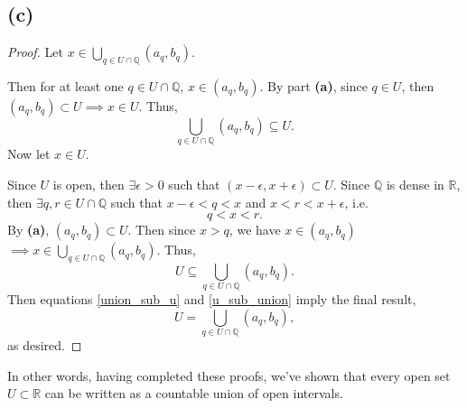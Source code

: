 \documentclass{article}
\begin{document}
\subsection*{(c)}
\begin{proof}
	Let $x \in \bigcup_{q \in U\cap\mathbb{Q}}(a_q, b_q)$. 
	
	Then for at least one $q\in U\cap \mathbb{Q}$, $x\in(a_q, b_q)$. By part \textbf{(a)}, since $q\in U$, then $(a_q, b_q) \subset U \implies x \in U$. Thus,
	\begin{equation}\label{union_sub_u}
		\bigcup\limits_{q \in U\cap\mathbb{Q}} (a_q, b_q) \subseteq U.
	\end{equation}
	Now let $x \in U$. 
	
	Since $U$ is open, then $\exists \epsilon >0$ such that $(x-\epsilon, x+\epsilon) \subset U$. Since $\mathbb{Q}$ is dense in $\mathbb{R}$, then $\exists q,r \in U\cap\mathbb{Q}$ such that $x-\epsilon<q<x$ and $x<r<x+\epsilon$, i.e. 
	\begin{equation}
		q<x<r.
	\end{equation}
	By \textbf{(a)}, $(a_q, b_q)\subset U$. Then since $x>q$, we have $x\in(a_q, b_q)$ \\$\implies x \in \bigcup_{q \in U\cap\mathbb{Q}}(a_q, b_q)$. Thus,
	\begin{equation}\label{u_sub_union}
		U \subseteq \bigcup\limits_{q \in U\cap\mathbb{Q}} (a_q, b_q). 
	\end{equation}
	Then equations \eqref{union_sub_u} and \eqref{u_sub_union} imply the final result,
	\begin{equation}
		U = \bigcup\limits_{q \in U\cap\mathbb{Q}} (a_q, b_q), 
	\end{equation}
	as desired.
\end{proof}
In other words, having completed these proofs, we've shown that every open set $U\subset \mathbb{R}$ can be written as a countable union of open intervals. 
\end{document}
